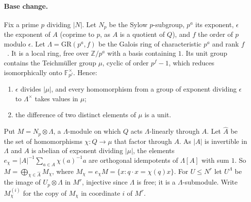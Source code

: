 \documentclass[11pt]{article}
\theoremstyle{definition}
\theoremstyle{remark}
\newcommand{\Z}{\mathbb Z}
\newcommand{\Chars}{\widehat{A}}
\begin{document}
\paragraph{Base change.} Fix a prime $p$ dividing $|N|$. Let $N_p$ be the Sylow
$p$-subgroup, $p^a$ its exponent, $\epsilon$ the exponent of $A$ (coprime to
$p$, as $A$ is a quotient of $Q$), and $f$ the order of $p$ modulo $\epsilon$. Let
$\Lambda=\mathrm{GR}(p^a,f)$ be the Galois ring of characteristic $p^a$ and rank
$f$~\cite{Wan03}. It is a local ring, free over $\Z/p^a$ with a basis containing
$1$. Its unit group contains the Teichmüller group $\mu$, cyclic of order
$p^f-1$, which reduces isomorphically onto $\mathbb F_{p^f}^\times$. Hence:
\begin{enumerate}
\item[(i)] $\epsilon$ divides $|\mu|$, and every homomorphism from a group of
exponent dividing $\epsilon$ to $\Lambda^\times$ takes values in $\mu$;
\item[(ii)] the difference of two distinct elements of $\mu$ is a unit.
\end{enumerate}
Put $M=N_p\otimes\Lambda$, a $\Lambda$-module on which $Q$ acts
$\Lambda$-linearly through $A$. Let $\Chars$ be the set of homomorphisms
$\chi\colon Q\to\mu$ that factor through $A$. As $|A|$ is invertible in $\Lambda$
and $A$ is abelian of exponent dividing $|\mu|$, the elements
$e_\chi=|A|^{-1}\sum_{a\in A}\chi(a)^{-1}a$ are orthogonal idempotents of
$\Lambda[A]$ with sum $1$. So $M=\bigoplus_{\chi\in\Chars}M_\chi$, where
$M_\chi=e_\chi M=\{x:q\cdot x=\chi(q)x\}$. For $U\le N^r$ let $U^\Lambda$ be the
image of $U_p\otimes\Lambda$ in $M^r$, injective since $\Lambda$ is free; it is a
$\Lambda$-submodule. Write $M_\chi^{(i)}$ for the copy of $M_\chi$ in coordinate
$i$ of $M^r$.
\end{document}
